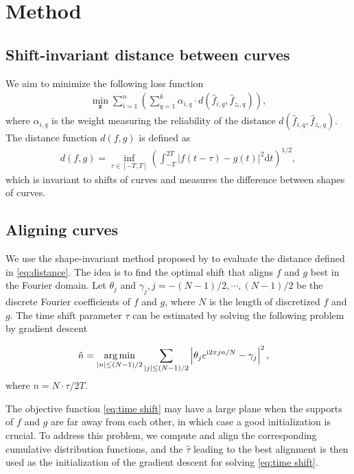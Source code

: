 

\section{Method} \label{sec:method}

\subsection{Shift-invariant distance between curves}
We aim to minimize the following loss function
\begin{align}
\min_{\mathbf{z}} \sum_{i=1}^n \left(  \sum_{q=1}^k \alpha_{i,q} \cdot d(\hat f_{i,q}, \hat f_{z_i,q}) \right),
\label{eq:loss function}
\end{align}
where $\alpha_{i,q}$ is the weight measuring the reliability of the distance  $d(\hat f_{i,q}, \hat f_{z_i,q})$. 
The distance function $d(f, g)$ is defined as
\begin{align}
d(f,g)=\inf_{\tau\in[-T,T]} \left( \int_{-T}^{2T} |f(t-\tau)-g(t)|^2 \text{d}t \right)^{1/2} ,
\label{eq:distance}
\end{align}
which is invariant to shifts of curves and measures the difference between shapes of curves.




\subsection{Aligning curves}
We use the shape-invariant method proposed by \citet{Bigot2013} to evaluate the distance defined in \eqref{eq:distance}.
The idea is to find the optimal shift that aligns $f$ and $g$ best in the Fourier domain.
Let $\theta_j$ and $\gamma_j, j=-(N-1)/2,\cdots,(N-1)/2$ be the discrete Fourier coefficients of $f$ and $g$, where $N$ is the length of discretized $f$ and $g$. The time shift parameter $\tau$ can be estimated by solving the following problem by gradient descent

	\begin{equation}
	\begin{aligned}\label{eq:time shift}
	\hat n&=
	\underset{|n|\leq (N-1)/2}{\arg\min}
	\sum_{|j|\leq (N-1)/2}
	\left| \theta_{j}e^{\complexunit 2\pi j n/N}
	-\gamma_{j} \right|^2
	,
	\end{aligned}
	\end{equation}
where $n=N\cdot\tau/2T$.

The objective function \eqref{eq:time shift} may have a large plane when the supports of $f$ and $g$ are far away from each other, in which case a good initialization is crucial.
To address this problem, we compute and align the corresponding cumulative distribution functions, and the $\hat\tau$ leading to the best alignment is then used as the initialization of the gradient descent for solving \eqref{eq:time shift}.

